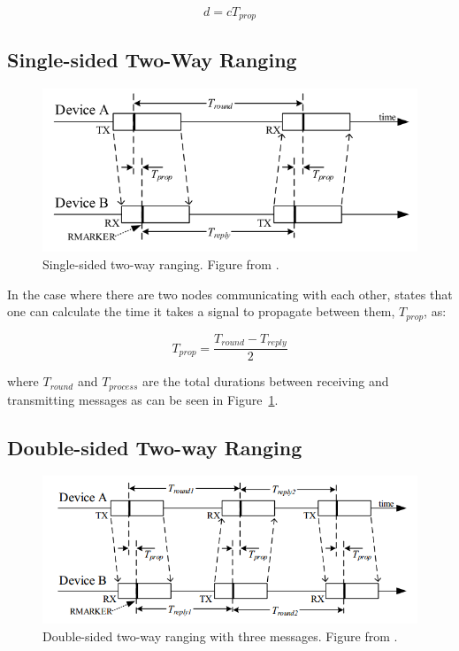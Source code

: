 \[
	d = c T_{prop}
\] 

\subsection{Single-sided Two-Way Ranging}
\begin{figure}
	\centering
	\includegraphics[width=\linewidth]{Figures/BasicRanging.png}
	\decoRule
	\caption{Single-sided two-way ranging. Figure from \parencite{DW1000UserManual}.}
	\label{fig:BasicRanging}
\end{figure}

In the case where there are two nodes communicating with each other, \parencite{DW1000UserManual} states that one can calculate the time it takes a signal to propagate between them, $T_{prop}$, as:

\[
	T_{prop} = \frac{T_{round} - T_{reply}}{2}
\]

where $T_{round}$ and $T_{process}$ are the total durations between receiving and transmitting messages as can be seen in Figure~\ref{fig:BasicRanging}.

\subsection{Double-sided Two-way Ranging}

\begin{figure}
	\centering
	\includegraphics[width=\linewidth]{Figures/AsyncRanging.png}
	\decoRule
	\caption{Double-sided two-way ranging with three messages. Figure from \parencite{DW1000UserManual}.}
	\label{fig:AsyncRanging}
\end{figure}

